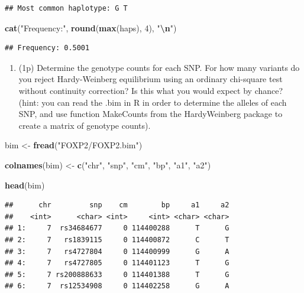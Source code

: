 \documentclass[
]{article}
\newenvironment{Shaded}{\begin{snugshade}}{\end{snugshade}}
\newcommand{\DecValTok}[1]{\textcolor[rgb]{0.00,0.00,0.81}{#1}}
\newcommand{\FunctionTok}[1]{\textcolor[rgb]{0.13,0.29,0.53}{\textbf{#1}}}
\newcommand{\NormalTok}[1]{#1}
\newcommand{\OtherTok}[1]{\textcolor[rgb]{0.56,0.35,0.01}{#1}}
\newcommand{\SpecialCharTok}[1]{\textcolor[rgb]{0.81,0.36,0.00}{\textbf{#1}}}
\newcommand{\StringTok}[1]{\textcolor[rgb]{0.31,0.60,0.02}{#1}}
\providecommand{\tightlist}{%
  \setlength{\itemsep}{0pt}\setlength{\parskip}{0pt}}
\begin{document}
\begin{verbatim}
## Most common haplotype: G T
\end{verbatim}

\begin{Shaded}
\begin{Highlighting}[]
\FunctionTok{cat}\NormalTok{(}\StringTok{"Frequency:"}\NormalTok{, }\FunctionTok{round}\NormalTok{(}\FunctionTok{max}\NormalTok{(haps), }\DecValTok{4}\NormalTok{), }\StringTok{"}\SpecialCharTok{\textbackslash{}n}\StringTok{"}\NormalTok{)}
\end{Highlighting}
\end{Shaded}

\begin{verbatim}
## Frequency: 0.5001
\end{verbatim}

\begin{enumerate}
\def\labelenumi{\arabic{enumi}.}
\setcounter{enumi}{3}
\tightlist
\item
  (1p) Determine the genotype counts for each SNP. For how many variants
  do you reject Hardy-Weinberg equilibrium using an ordinary chi-square
  test without continuity correction? Is this what you would expect by
  chance? (hint: you can read the .bim in R in order to determine the
  alleles of each SNP, and use function MakeCounts from the
  HardyWeinberg package to create a matrix of genotype counts).
\end{enumerate}

\begin{Shaded}
\begin{Highlighting}[]
\NormalTok{bim }\OtherTok{\textless{}{-}} \FunctionTok{fread}\NormalTok{(}\StringTok{"FOXP2/FOXP2.bim"}\NormalTok{)}

\FunctionTok{colnames}\NormalTok{(bim) }\OtherTok{\textless{}{-}} \FunctionTok{c}\NormalTok{(}\StringTok{"chr"}\NormalTok{, }\StringTok{"snp"}\NormalTok{, }\StringTok{"cm"}\NormalTok{, }\StringTok{"bp"}\NormalTok{, }\StringTok{"a1"}\NormalTok{, }\StringTok{"a2"}\NormalTok{)}

\FunctionTok{head}\NormalTok{(bim)}
\end{Highlighting}
\end{Shaded}

\begin{verbatim}
##      chr         snp    cm        bp     a1     a2
##    <int>      <char> <int>     <int> <char> <char>
## 1:     7  rs34684677     0 114400288      T      G
## 2:     7   rs1839115     0 114400872      C      T
## 3:     7   rs4727804     0 114400999      G      A
## 4:     7   rs4727805     0 114401123      T      G
## 5:     7 rs200888633     0 114401388      T      G
## 6:     7  rs12534908     0 114402258      G      A
\end{verbatim}
\end{document}
